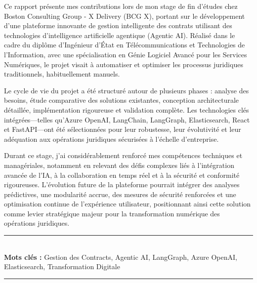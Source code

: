 Ce rapport présente mes contributions lors de mon stage de fin d’études chez Boston Consulting Group - X Delivery (BCG X), portant sur le développement d’une plateforme innovante de gestion intelligente des contrats utilisant des technologies d’intelligence artificielle agentique (Agentic AI). Réalisé dans le cadre du diplôme d’Ingénieur d’État en Télécommunications et Technologies de l’Information, avec une spécialisation en Génie Logiciel Avancé pour les Services Numériques, le projet visait à automatiser et optimiser les processus juridiques traditionnels, habituellement manuels.\mynewline

Le cycle de vie du projet a été structuré autour de plusieurs phases : analyse des besoins, étude comparative des solutions existantes, conception architecturale détaillée, implémentation rigoureuse et validation complète. Les technologies clés intégrées—telles qu’Azure OpenAI, LangChain, LangGraph, Elasticsearch, React et FastAPI—ont été sélectionnées pour leur robustesse, leur évolutivité et leur adéquation aux opérations juridiques sécurisées à l’échelle d’entreprise.\mynewline

Durant ce stage, j’ai considérablement renforcé mes compétences techniques et managériales, notamment en relevant des défis complexes liés à l’intégration avancée de l’IA, à la collaboration en temps réel et à la sécurité et conformité rigoureuses. L’évolution future de la plateforme pourrait intégrer des analyses prédictives, une modularité accrue, des mesures de sécurité renforcées et une optimisation continue de l’expérience utilisateur, positionnant ainsi cette solution comme levier stratégique majeur pour la transformation numérique des opérations juridiques.

\bigskip

\noindent\rule{\linewidth}{0.3mm} \\[0.4cm] 
\textbf{Mots clés :}
Gestion des Contracts, Agentic AI, LangGraph, Azure OpenAI, Elasticsearch, Transformation Digitale
\\[0.1cm]
\noindent\rule{\linewidth}{0.3mm} \\[0.6cm] 
